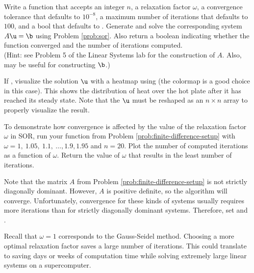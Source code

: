\begin{problem}
Write a function that accepts an integer $n$, a relaxation factor $\omega$, a convergence tolerance  that defaults to $10^{-8}$, a maximum number of iterations  that defaults to $100$, and a bool  that defaults to .
Generate and solve the corresponding system $A\u = \b$ using Problem \ref{prob:sor}.
Also return a boolean indicating whether the function converged and the number of iterations computed.
\\ (Hint: see Problem 5 of the Linear Systems lab for the construction of $A$.
Also,  may be useful for constructing $\b$.)

If , visualize the solution $\u$ with a heatmap using  (the colormap  is a good choice in this case).
This shows the distribution of heat over the hot plate after it has reached its steady state.
Note that the $\u$ must be reshaped as an $n\times n$ array to properly visualize the result.
\label{prob:finite-difference-setup}
\end{problem}

\begin{problem}
To demonstrate how convergence is affected by the value of the relaxation factor $\omega$ in SOR, run your function from Problem \ref{prob:finite-difference-setup} with $\omega = 1,\ 1.05,\ 1.1,\ \dots , 1.9, 1.95$ and $n = 20$.
Plot the number of computed iterations as a function of $\omega$.
Return the value of $\omega$ that results in the least number of iterations.

Note that the matrix $A$ from Problem \ref{prob:finite-difference-setup} is not strictly diagonally dominant.
However, $A$ is positive definite, so the algorithm will converge.
Unfortunately, convergence for these kinds of systems usually requires more iterations than for strictly diagonally dominant systems.
Therefore, set  and .

Recall that $\omega = 1$ corresponds to the Gauss-Seidel method.
Choosing a more optimal relaxation factor saves a large number of iterations.
This could translate to saving days or weeks of computation time while solving extremely large linear systems on a supercomputer.
\end{problem}

